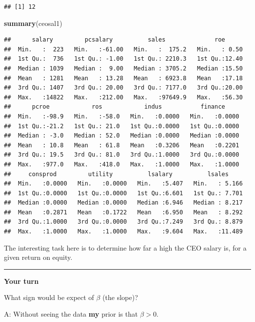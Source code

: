 \documentclass[]{book}
\newenvironment{Shaded}{\begin{snugshade}}{\end{snugshade}}
\newcommand{\KeywordTok}[1]{\textcolor[rgb]{0.13,0.29,0.53}{\textbf{#1}}}
\newcommand{\NormalTok}[1]{#1}
\begin{document}
\begin{verbatim}
## [1] 12
\end{verbatim}

\begin{Shaded}
\begin{Highlighting}[]
\KeywordTok{summary}\NormalTok{(ceosal1)}
\end{Highlighting}
\end{Shaded}

\begin{verbatim}
##      salary         pcsalary          sales              roe       
##  Min.   :  223   Min.   :-61.00   Min.   :  175.2   Min.   : 0.50  
##  1st Qu.:  736   1st Qu.: -1.00   1st Qu.: 2210.3   1st Qu.:12.40  
##  Median : 1039   Median :  9.00   Median : 3705.2   Median :15.50  
##  Mean   : 1281   Mean   : 13.28   Mean   : 6923.8   Mean   :17.18  
##  3rd Qu.: 1407   3rd Qu.: 20.00   3rd Qu.: 7177.0   3rd Qu.:20.00  
##  Max.   :14822   Max.   :212.00   Max.   :97649.9   Max.   :56.30  
##      pcroe            ros            indus           finance      
##  Min.   :-98.9   Min.   :-58.0   Min.   :0.0000   Min.   :0.0000  
##  1st Qu.:-21.2   1st Qu.: 21.0   1st Qu.:0.0000   1st Qu.:0.0000  
##  Median : -3.0   Median : 52.0   Median :0.0000   Median :0.0000  
##  Mean   : 10.8   Mean   : 61.8   Mean   :0.3206   Mean   :0.2201  
##  3rd Qu.: 19.5   3rd Qu.: 81.0   3rd Qu.:1.0000   3rd Qu.:0.0000  
##  Max.   :977.0   Max.   :418.0   Max.   :1.0000   Max.   :1.0000  
##     consprod         utility          lsalary          lsales      
##  Min.   :0.0000   Min.   :0.0000   Min.   :5.407   Min.   : 5.166  
##  1st Qu.:0.0000   1st Qu.:0.0000   1st Qu.:6.601   1st Qu.: 7.701  
##  Median :0.0000   Median :0.0000   Median :6.946   Median : 8.217  
##  Mean   :0.2871   Mean   :0.1722   Mean   :6.950   Mean   : 8.292  
##  3rd Qu.:1.0000   3rd Qu.:0.0000   3rd Qu.:7.249   3rd Qu.: 8.879  
##  Max.   :1.0000   Max.   :1.0000   Max.   :9.604   Max.   :11.489
\end{verbatim}

The interesting task here is to determine how far a high the CEO salary is, for a given return on equity.

\begin{center}\rule{0.5\linewidth}{\linethickness}\end{center}

\textbf{Your turn}

What sign would be expect of \(\beta\) (the slope)?

A: Without seeing the data \textbf{my} prior is that \(\beta > 0\).
\end{document}
